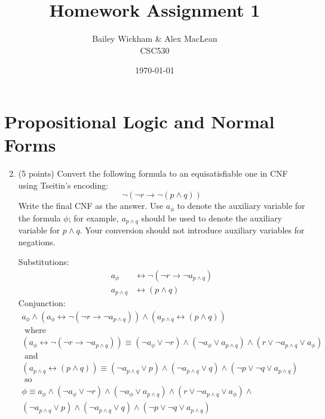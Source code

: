 \documentclass{article}
\title{Homework Assignment 1}
\author{Bailey Wickham \& Alex MacLean\\ CSC530}
\date\today
\newenvironment{solution}{\color{blue} \em }{}
\begin{document}
\maketitle

\section{Propositional Logic and Normal Forms}


\begin{enumerate}
	\setcounter{enumi}{1}

\item (5 points)  Convert the following formula to an equisatisfiable one in CNF using Tseitin's encoding:
\[\neg ( \neg r \rightarrow \neg (p \land q))\]
Write the final CNF as the answer.
Use $a_\phi$ to denote the auxiliary variable for the formula $\phi$;
for example, $a_{p\wedge q}$ should be used to denote the auxiliary variable for $p\wedge q$.
Your conversion should not introduce auxiliary variables for negations.

\begin{solution}

Substitutions:
\begin{align*}
    a_{\phi} &\leftrightarrow \neg (\neg r \rightarrow \neg a_{p \wedge q}) \\
    a_{p\wedge q} &\leftrightarrow (p \wedge q)
\end{align*}
Conjunction:
\begin{gather*}
    a_{\phi} \wedge (a_{\phi} \leftrightarrow \neg (\neg r \rightarrow \neg a_{p \wedge q})) \land
    (a_{p\wedge q} \leftrightarrow (p \wedge q))
    \\ \text{ where }  \\
    (a_{\phi} \leftrightarrow \neg (\neg r \rightarrow \neg a_{p \wedge q})) \equiv
(\neg a_\phi \lor \neg r) \land (\neg a_\phi \lor a_{p \land q}) \land (r \lor \neg a_{p \land q} \lor a_\phi) \\
    \text{ and } \\
    (a_{p\wedge q} \leftrightarrow (p \wedge q)) \equiv
    (\neg a_{p\wedge q} \lor p ) \land (\neg a_{p\land q} \lor q) \wedge (\neg p \lor \neg q \lor a_{p\wedge q}) \\
    \text{ so } \\
    \phi \equiv
    a_\phi \land
(\neg a_\phi \lor \neg r) \land (\neg a_\phi \lor a_{p \land q}) \land (r \lor \neg a_{p \land q} \lor a_\phi) \land \\
    (\neg a_{p\wedge q} \lor p ) \land (\neg a_{p\land q} \lor q) \wedge (\neg p \lor \neg q \lor a_{p\wedge q})
\end{gather*}


\end{solution}
\end{enumerate}
\end{document}
